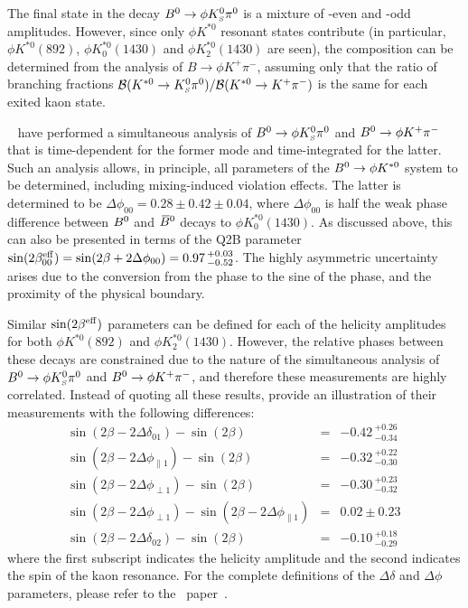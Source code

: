 \label{sec:cp_uta:qqs:vv}

The final state in the decay $B^0 \to \phi K^0_{\scriptscriptstyle S} \pi^0$ is a mixture of \CP-even
and \CP-odd amplitudes. However, since only $\phi K^{*0}$ resonant states
contribute (in particular, $\phi K^{*0}(892)$, $\phi K^{*0}_0(1430)$ and $\phi
K^{*0}_2(1430)$ are seen), the composition can be determined from the analysis
of $B \to \phi K^+ \pi^-$, assuming only that the ratio of branching fractions
${\cal B}(K^{*0} \to K^0_{\scriptscriptstyle S} \pi^0)/{\cal B}(K^{*0} \to K^+ \pi^-)$ is the same
for each exited kaon state. 

\babar~\cite{Aubert:2008zza} have performed a simultaneous analysis of 
$B^0 \to \phi K^0_{\scriptscriptstyle S} \pi^0$ and $B^0 \to \phi K^+ \pi^-$ that is time-dependent
for the former mode and time-integrated for the latter. Such an analysis
allows, in principle, all parameters of the $B^0 \to \phi K^{*0}$ system to be
determined, including mixing-induced \CP violation effects. The latter is
determined to be $\Delta\phi_{00} = 0.28 \pm 0.42 \pm 0.04$, where
$\Delta\phi_{00}$ is half the weak phase difference between $B^0$ and $\kern 0.18em\overline{\kern -0.18em B}{}^0$
decays to $\phi K^{*0}_0(1430)$. As discussed above, this can also be
presented in terms of the Q2B parameter $\sin(2\beta^{\rm eff}_{00}) =
\sin(2\beta+2\Delta\phi_{00}) = 0.97 \,^{+0.03}_{-0.52}$. The highly asymmetric
uncertainty arises due to the conversion from the phase to the sine of the
phase, and the proximity of the physical boundary. 

Similar $\sin(2\beta^{\rm eff})$ parameters can be defined for each of the
helicity amplitudes for both $\phi K^{*0}(892)$ and $\phi
K^{*0}_2(1430)$. However, the relative phases between these decays are
constrained due to the nature of the simultaneous analysis of $B^0 \to \phi
K^0_{\scriptscriptstyle S} \pi^0$ and $B^0 \to \phi K^+ \pi^-$, and therefore these measurements are
highly correlated. Instead of quoting all these results, \babar provide an
illustration of their measurements with the following differences: 
\begin{eqnarray}
  \sin(2\beta - 2\Delta\delta_{01}) - \sin(2\beta) & = & -0.42\,^{+0.26}_{-0.34} \, \\
  \sin(2\beta - 2\Delta\phi_{\parallel1}) - \sin(2\beta) & = & -0.32\,^{+0.22}_{-0.30} \, \\
  \sin(2\beta - 2\Delta\phi_{\perp1}) - \sin(2\beta) & = & -0.30\,^{+0.23}_{-0.32} \, \\
  \sin(2\beta - 2\Delta\phi_{\perp1}) - \sin(2\beta - 2\Delta\phi_{\parallel1})
  & = & 0.02 \pm 0.23 \, \\
  \sin(2\beta - 2\Delta\delta_{02}) - \sin(2\beta) & = & -0.10\,^{+0.18}_{-0.29} \,
\end{eqnarray}
where the first subscript indicates the helicity amplitude and the second
indicates the spin of the kaon resonance. For the complete definitions of the
$\Delta\delta$ and $\Delta\phi$ parameters, please refer to the \babar\ paper~\cite{Aubert:2008zza}.

